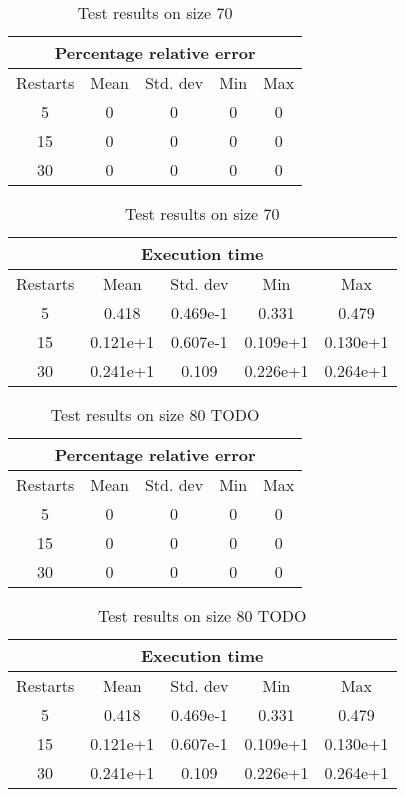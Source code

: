 \begin{table}[h]
	\caption{Test results on size 70}
	\label{tab:t50}
	\setlength\tabcolsep{4pt}
	\begin{subtable}[t]{0.35\linewidth}
		\centering
		\begin{tabular}[t]{ccccc}
			\hline
			\multicolumn{5}{c}{Percentage relative error}  \\ \hline
			Restarts & Mean & Std. dev & Min & Max \\ \hline
			5        & 0    & 0        & 0   & 0   \\
			15       & 0    & 0        & 0   & 0   \\
			30       & 0    & 0        & 0   & 0  
		\end{tabular}
	\end{subtable}
	\hspace{1.8cm}
	\begin{subtable}[t]{0.42\linewidth}
		\centering
		\begin{tabular}[t]{ccccc}
			\hline
			\multicolumn{5}{c}{Execution time} \\ \hline
			Restarts & Mean & Std. dev & Min & Max \\ \hline
			5 & 0.418 & 0.469e-1 & 0.331 & 0.479 \\
			15 & 0.121e+1 & 0.607e-1 & 0.109e+1 & 0.130e+1 \\
			30 & 0.241e+1 & 0.109 & 0.226e+1 & 0.264e+1
		\end{tabular}
	\end{subtable}
\end{table}

\begin{table}[h]
	\caption{Test results on size 80 TODO}
	\label{tab:t50}
	\setlength\tabcolsep{4pt}
	\begin{subtable}[t]{0.35\linewidth}
		\centering
		\begin{tabular}[t]{ccccc}
			\hline
			\multicolumn{5}{c}{Percentage relative error}  \\ \hline
			Restarts & Mean & Std. dev & Min & Max \\ \hline
			5        & 0    & 0        & 0   & 0   \\
			15       & 0    & 0        & 0   & 0   \\
			30       & 0    & 0        & 0   & 0  
		\end{tabular}
	\end{subtable}
	\hspace{1.8cm}
	\begin{subtable}[t]{0.42\linewidth}
		\centering
		\begin{tabular}[t]{ccccc}
			\hline
			\multicolumn{5}{c}{Execution time} \\ \hline
			Restarts & Mean & Std. dev & Min & Max \\ \hline
			5 & 0.418 & 0.469e-1 & 0.331 & 0.479 \\
			15 & 0.121e+1 & 0.607e-1 & 0.109e+1 & 0.130e+1 \\
			30 & 0.241e+1 & 0.109 & 0.226e+1 & 0.264e+1
		\end{tabular}
	\end{subtable}
\end{table}